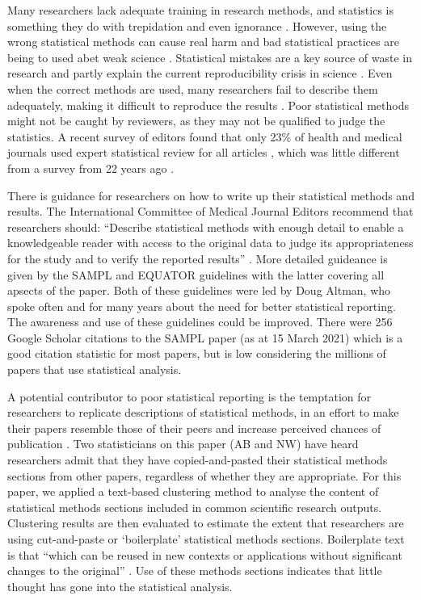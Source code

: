 \documentclass[12pt]{article}
\begin{document}
Many researchers lack adequate training in research methods, and
statistics is something they do with trepidation and even ignorance
\citep{Altman1994, King2019}. However, using the wrong statistical
methods can cause real harm \citep{Altman1994, Brown2018} and bad
statistical practices are being to used abet weak science
\citep{Stark2018}. Statistical mistakes are a key source of waste in
research and partly explain the current reproducibility crisis in
science \citep{Allison2016}. Even when the correct methods are used,
many researchers fail to describe them adequately, making it difficult
to reproduce the results \citep{Ernst2017, Zhou2018}. Poor statistical
methods might not be caught by reviewers, as they may not be qualified
to judge the statistics. A recent survey of editors found that only 23\%
of health and medical journals used expert statistical review for all
articles \citep{Hardwicke2020}, which was little different from a survey
from 22 years ago \citep{Goodman1998}.

There is guidance for researchers on how to write up their statistical
methods and results. The International Committee of Medical Journal
Editors recommend that researchers should: ``Describe statistical
methods with enough detail to enable a knowledgeable reader with access
to the original data to judge its appropriateness for the study and to
verify the reported results'' \citep{ICMJE2019}. More detailed guideance
is given by the SAMPL and EQUATOR guidelines
\citep{Lang2013, Altman2016} with the latter covering all apsects of the
paper. Both of these guidelines were led by Doug Altman, who spoke often
and for many years about the need for better statistical reporting. The
awareness and use of these guidelines could be improved. There were 256
Google Scholar citations to the SAMPL paper (as at 15 March 2021) which
is a good citation statistic for most papers, but is low considering the
millions of papers that use statistical analysis.

A potential contributor to poor statistical reporting is the temptation for researchers to replicate
descriptions of statistical methods, in an effort to make their papers resemble those of their peers 
and increase perceived chances of publication  \citep{Diong2018}. Two statisticians on this paper 
(AB and NW) have heard researchers admit
that they have copied-and-pasted their statistical methods sections from
other papers, regardless of whether they are appropriate. For this paper, we applied a text-based 
clustering method to analyse the content of statistical methods sections included in common scientific research outputs.
Clustering results are then evaluated to estimate the extent that researchers are
using cut-and-paste or `boilerplate' statistical methods sections.
Boilerplate text is that ``which can be reused in new contexts or
applications without significant changes to the original''
\citep{Wikipedia}. Use of these methods sections indicates that little
thought has gone into the statistical analysis.
\end{document}

